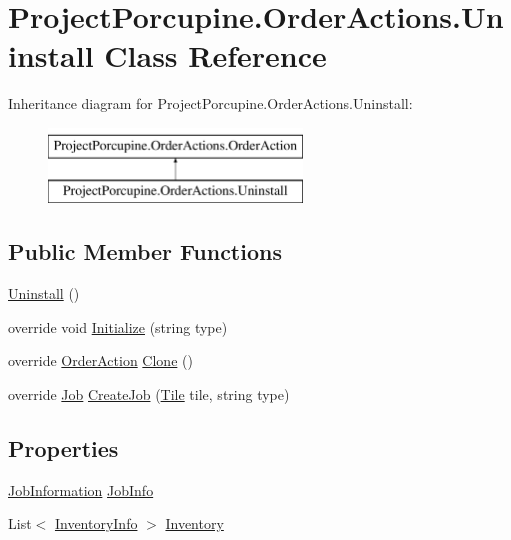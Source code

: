 \hypertarget{class_project_porcupine_1_1_order_actions_1_1_uninstall}{}\section{Project\+Porcupine.\+Order\+Actions.\+Uninstall Class Reference}
\label{class_project_porcupine_1_1_order_actions_1_1_uninstall}
Inheritance diagram for Project\+Porcupine.\+Order\+Actions.\+Uninstall\+:\begin{figure}[H]
\begin{center}
\leavevmode
\includegraphics[height=2.000000cm]{class_project_porcupine_1_1_order_actions_1_1_uninstall}
\end{center}
\end{figure}
\subsection*{Public Member Functions}
\begin{DoxyCompactItemize}
\item 
\hyperlink{class_project_porcupine_1_1_order_actions_1_1_uninstall_a76e70f1a5a89580a21be04e6f9497d8c}{Uninstall} ()
\item 
override void \hyperlink{class_project_porcupine_1_1_order_actions_1_1_uninstall_a870ae2bac8212aab9b722f294725db45}{Initialize} (string type)
\item 
override \hyperlink{class_project_porcupine_1_1_order_actions_1_1_order_action}{Order\+Action} \hyperlink{class_project_porcupine_1_1_order_actions_1_1_uninstall_a2608888052c16ab5e453408ca28a7bf1}{Clone} ()
\item 
override \hyperlink{class_job}{Job} \hyperlink{class_project_porcupine_1_1_order_actions_1_1_uninstall_a24d59eabcb853fd7b3e84ba1c10568fc}{Create\+Job} (\hyperlink{class_tile}{Tile} tile, string type)
\end{DoxyCompactItemize}
\subsection*{Properties}
\begin{DoxyCompactItemize}
\item 
\hyperlink{class_project_porcupine_1_1_order_actions_1_1_order_action_1_1_job_information}{Job\+Information} \hyperlink{class_project_porcupine_1_1_order_actions_1_1_uninstall_a7ae6e09e05eda545d09f31a89264ab56}{Job\+Info}
\item 
List$<$ \hyperlink{class_project_porcupine_1_1_order_actions_1_1_order_action_1_1_inventory_info}{Inventory\+Info} $>$ \hyperlink{class_project_porcupine_1_1_order_actions_1_1_uninstall_a09b143dcff019e2e324189c304bb78fb}{Inventory}
\end{DoxyCompactItemize}
